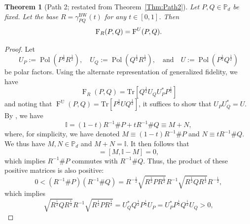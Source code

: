 \documentclass[12pt]{article}
\newtheorem{theorem}{Theorem}[section] %
\theoremstyle{definition}
\begin{document}
\begin{theorembox}
    \begin{theorem}[Path 2; restated from Theorem~\ref{Thm:Path2}]\label{App:ThmPath2}
        Let $P, Q \in \mathbb P_d$ be fixed. Let the base $R = \gamma^{\mathrm{BW}}_{PQ}(t)$ for any $t \in [0,1]$. Then
        \begin{equation}
            \operatorname{F}_R(P,Q) = \operatorname{F}^{\emph U}(P,Q). 
        \end{equation}
    \end{theorem}
\end{theorembox}
\begin{proof}
Let
\begin{equation}
    U_P := \operatorname{Pol}\left(P ^{\frac 12} R ^{\frac 12}\right), \quad U_Q := \operatorname{Pol}\left(Q ^{\frac 12} R ^{\frac 12}\right), \quad \text{and} \quad U := \operatorname{Pol}\left(P ^{\frac 12} Q ^{\frac 12}\right)
\end{equation}
be polar factors. Using the alternate representation of generalized fidelity, we have
\begin{equation}
     \operatorname{F}_R(P,Q) = \text{Tr} \left[Q ^{\frac 12} U_Q U_P^* P ^{\frac 12} \right]
\end{equation}
and noting that $\operatorname{F}^\mathrm U(P,Q) = \text{Tr}\left[P ^{\frac 12} U Q ^{\frac 12} \right]$, it suffices to show that $U_P U_Q^* = U$. By , we have
\begin{equation}
\mathbb{I} = (1-t) R ^{-1} \# P + t R^{-1} \# Q \equiv M + N,
\end{equation}
where, for simplicity, we have denoted $M \equiv (1-t) R^{-1} \# P$ and $N \equiv t R ^{-1} \# Q $. We thus have $M, N \in \mathbb{P}_d$ and $M+N = \mathbb{I}$. It then follows that
\begin{equation}
[M,N] = [M, \mathbb{I} - M] = 0,
\end{equation}
which implies $R^{-1} \# P$ commutes with $R^{-1} \# Q$. Thus, the product of these positive matrices is also positive:
\begin{equation}
0 < (R ^{-1} \# P)(R^{-1} \# Q) = R^{-\frac 12} \sqrt{R^{\frac 12} P R^{\frac 12}} R^{-1} \sqrt{R^{\frac 12} Q R^{\frac 12}} R^{-\frac 12},
\end{equation}
which implies 
\begin{equation}
\sqrt{R^{\frac 12} Q R^{\frac 12}} R^{-1} \sqrt{R^{\frac 12} P R^{\frac 12}} = U^*_Q Q^{\frac 12} P^{\frac 12} U_P = U^*_P P^{\frac 12} Q^{\frac 12} U_Q > 0,
\end{equation}

\end{proof}
\end{document}
